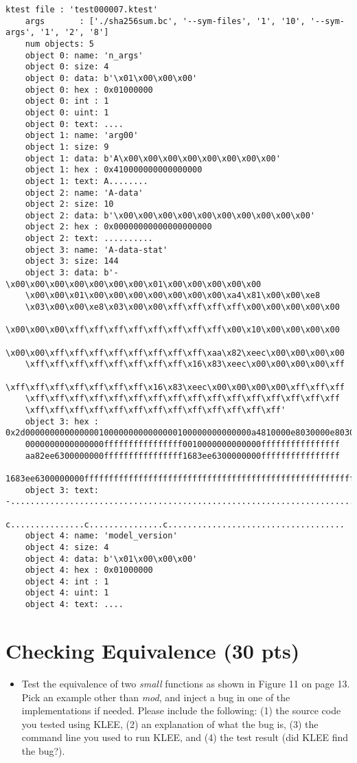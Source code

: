 \documentclass[12pt,letterpaper]{article}
\begin{document}
\begin{mdframed}
\begin{lstlisting}[basicstyle=\tiny]
    ktest file : 'test000007.ktest'
    args       : ['./sha256sum.bc', '--sym-files', '1', '10', '--sym-args', '1', '2', '8']
    num objects: 5
    object 0: name: 'n_args'
    object 0: size: 4
    object 0: data: b'\x01\x00\x00\x00'
    object 0: hex : 0x01000000
    object 0: int : 1
    object 0: uint: 1
    object 0: text: ....
    object 1: name: 'arg00'
    object 1: size: 9
    object 1: data: b'A\x00\x00\x00\x00\x00\x00\x00\x00'
    object 1: hex : 0x410000000000000000
    object 1: text: A........
    object 2: name: 'A-data'
    object 2: size: 10
    object 2: data: b'\x00\x00\x00\x00\x00\x00\x00\x00\x00\x00'
    object 2: hex : 0x00000000000000000000
    object 2: text: ..........
    object 3: name: 'A-data-stat'
    object 3: size: 144
    object 3: data: b'-\x00\x00\x00\x00\x00\x00\x00\x01\x00\x00\x00\x00\x00
    \x00\x00\x01\x00\x00\x00\x00\x00\x00\x00\xa4\x81\x00\x00\xe8
    \x03\x00\x00\xe8\x03\x00\x00\xff\xff\xff\xff\x00\x00\x00\x00\x00
    \x00\x00\x00\xff\xff\xff\xff\xff\xff\xff\xff\x00\x10\x00\x00\x00\x00
    \x00\x00\xff\xff\xff\xff\xff\xff\xff\xff\xaa\x82\xeec\x00\x00\x00\x00
    \xff\xff\xff\xff\xff\xff\xff\xff\x16\x83\xeec\x00\x00\x00\x00\xff
    \xff\xff\xff\xff\xff\xff\xff\x16\x83\xeec\x00\x00\x00\x00\xff\xff\xff
    \xff\xff\xff\xff\xff\xff\xff\xff\xff\xff\xff\xff\xff\xff\xff\xff
    \xff\xff\xff\xff\xff\xff\xff\xff\xff\xff\xff\xff\xff'
    object 3: hex : 0x2d0000000000000001000000000000000100000000000000a4810000e8030000e8030000ffffffff
    0000000000000000ffffffffffffffff0010000000000000ffffffffffffffff
    aa82ee6300000000ffffffffffffffff1683ee6300000000ffffffffffffffff
    1683ee6300000000ffffffffffffffffffffffffffffffffffffffffffffffffffffffffffffffff
    object 3: text: -..........................................................................
    c...............c...............c....................................
    object 4: name: 'model_version'
    object 4: size: 4
    object 4: data: b'\x01\x00\x00\x00'
    object 4: hex : 0x01000000
    object 4: int : 1
    object 4: uint: 1
    object 4: text: ....
  \end{lstlisting}
\end{mdframed}

\newpage


\newpage


\section{Checking Equivalence (30 pts)}

\begin{itemize}
\item Test the equivalence of two \emph{small} functions as shown in
  Figure 11 on page 13. Pick an example other than \emph{mod}, and
  inject a bug in one of the implementations if needed. Please include
  the following: (1) the source code you tested using KLEE, (2) an
  explanation of what the bug is, (3) the command line you used to run
  KLEE, and (4) the test result (did KLEE find the bug?).
\end{itemize}
\end{document}
